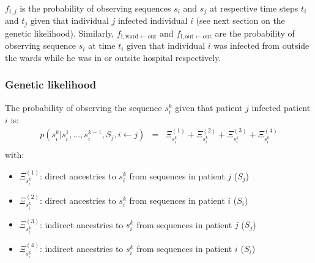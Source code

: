 \documentclass[10pt]{article}
\begin{document}
$f_{i,j}$ is the probability of observing sequences $s_i$ and $s_j$ at respective time steps $t_i$ and $t_j$ given that individual $j$ infected individual $i$ (see next section on the genetic likelihood). Similarly, $f_{\text{i},\text{ward} \leftarrow \text{out}}$ and $f_{\text{i},\text{out} \leftarrow \text{out}}$ are the probability of observing sequence $s_i$ at time $t_i$ given that individual $i$ was infected from outside the wards while he was in or outsite hospital respectively. 


\subsubsection*{Genetic likelihood}


The probability of observing the sequence $s_i^k$ given that patient $j$ infected patient $i$ is:
\begin{eqnarray*}
p(s_i^k | s_i^1, \ldots, s_i^{k-1}, S_j, i \leftarrow j) & = & \Xi_{s_i^k}^{(1)} + \Xi_{s_i^k}^{(2)} + \Xi_{s_i^k}^{(3)} + \Xi_{s_i^k}^{(4)}\\
\end{eqnarray*}
with:
\begin{itemize}
 \item $\Xi_{s_i^k}^{(1)}$: direct ancestries to $s_i^k$ from sequences in patient $j$ ($S_j$)
 \item $\Xi_{s_i^k}^{(2)}$: direct ancestries to $s_i^k$ from sequences in patient $i$ ($S_i$)
 \item $\Xi_{s_i^k}^{(3)}$: indirect ancestries to $s_i^k$ from sequences in patient $j$ ($S_j$)
 \item $\Xi_{s_i^k}^{(4)}$: indirect ancestries to $s_i^k$ from sequences in patient $i$ ($S_i$)
\end{itemize}
\end{document}
